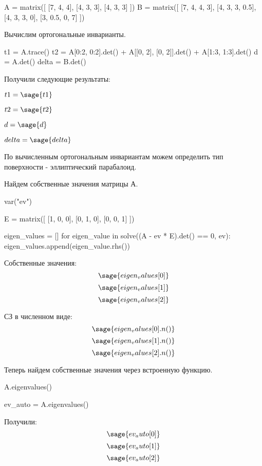 \documentclass{article}
\begin{document}
\begin{sageblock}
A = matrix([
    [7, 4, 4],
    [4, 3, 3],
    [4, 3, 3]
])
B = matrix([
    [7, 4, 4, 3],
    [4, 3, 3, 0.5],
    [4, 3, 3, 0],
    [3, 0.5, 0, 7]
])
\end{sageblock}

Вычислим ортогональные инварианты.

\begin{sageblock}
t1 = A.trace()
t2 = A[0:2, 0:2].det() + A[[0, 2], [0, 2]].det() + A[1:3, 1:3].det()
d = A.det()
delta = B.det()
\end{sageblock}

Получили следующие результаты:

\begin{center}
$t1 = \sage{t1}$

$t2 = \sage{t2}$

$d = \sage{d}$

$delta = \sage{delta}$
\end{center}

По вычисленным ортогональным инвариантам можем определить тип поверхности - эллиптический парабалоид.

Найдем собственные значения матрицы А.

\begin{sagesilent}
var("ev")
\end{sagesilent}

\begin{sageblock}
E = matrix([
    [1, 0, 0],
    [0, 1, 0],
    [0, 0, 1]
])

eigen_values = []
for eigen_value in solve((A - ev * E).det() == 0, ev):
    eigen_values.append(eigen_value.rhs())
\end{sageblock}

Собственные значения:
$$\sage{eigen_values[0]}$$
$$\sage{eigen_values[1]}$$
$$\sage{eigen_values[2]}$$

СЗ в численном виде: 
$$\sage{eigen_values[0].n()}$$
$$\sage{eigen_values[1].n()}$$
$$\sage{eigen_values[2].n()}$$

Теперь найдем собственные значения через встроенную функцию.

\begin{sageblock}
A.eigenvalues()
\end{sageblock}

\begin{sagesilent}
ev_auto = A.eigenvalues()
\end{sagesilent}

Получили: 
$$\sage{ev_auto[0]}$$
$$\sage{ev_auto[1]}$$
$$\sage{ev_auto[2]}$$ 
\end{document}
